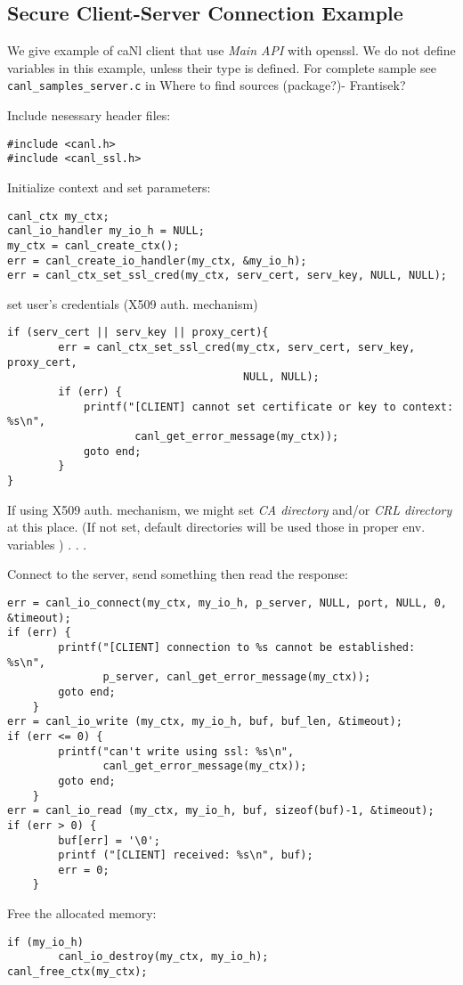 \subsection{Secure Client-Server Connection Example}
We give example of caNl client that use \textit{Main API} 
with openssl. We do not define variables in this example, unless
their type is \CANL defined. For complete sample see 
\verb'canl_samples_server.c' in 
\TODO Where to find sources (package?)- Frantisek?

Include nesessary header files:
\begin{lstlisting}
#include <canl.h>
#include <canl_ssl.h>
\end{lstlisting}

Initialize context and set parameters:
\begin{lstlisting}
canl_ctx my_ctx;
canl_io_handler my_io_h = NULL;
my_ctx = canl_create_ctx();
err = canl_create_io_handler(my_ctx, &my_io_h);
err = canl_ctx_set_ssl_cred(my_ctx, serv_cert, serv_key, NULL, NULL);
\end{lstlisting}

set user's credentials (X509 auth. mechanism)
\begin{lstlisting}
if (serv_cert || serv_key || proxy_cert){
        err = canl_ctx_set_ssl_cred(my_ctx, serv_cert, serv_key, proxy_cert,
                                     NULL, NULL);
        if (err) {
            printf("[CLIENT] cannot set certificate or key to context: %s\n",
                    canl_get_error_message(my_ctx));
            goto end;
        }
}
\end{lstlisting}

If using X509 auth. mechanism, we might set \textit{CA directory} and/or
 \textit{CRL directory} at this place. (If not set, default directories
will be used \Ie those in proper env. variables )
.
.
.

Connect to the server, send something then read the response:

\begin{lstlisting}
err = canl_io_connect(my_ctx, my_io_h, p_server, NULL, port, NULL, 0, &timeout);
if (err) {
        printf("[CLIENT] connection to %s cannot be established: %s\n",
               p_server, canl_get_error_message(my_ctx));
        goto end;
    }
err = canl_io_write (my_ctx, my_io_h, buf, buf_len, &timeout);
if (err <= 0) {
        printf("can't write using ssl: %s\n",
               canl_get_error_message(my_ctx));
        goto end;
    }
err = canl_io_read (my_ctx, my_io_h, buf, sizeof(buf)-1, &timeout);
if (err > 0) {
        buf[err] = '\0';
        printf ("[CLIENT] received: %s\n", buf);
        err = 0;
    }
\end{lstlisting}

Free the allocated memory:

\begin{lstlisting}
if (my_io_h)
        canl_io_destroy(my_ctx, my_io_h);
canl_free_ctx(my_ctx);
\end{lstlisting}

